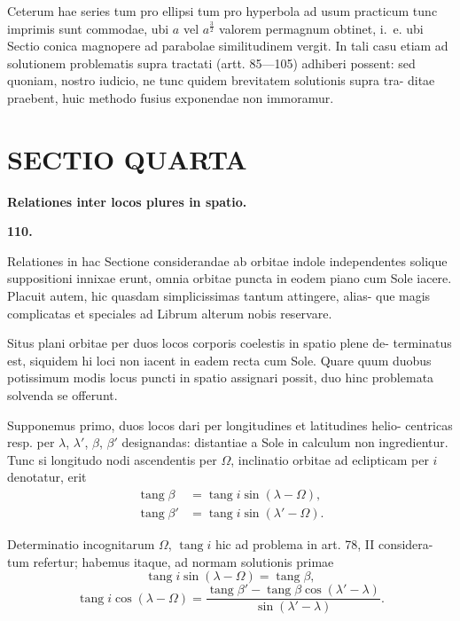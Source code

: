 \documentclass[12pt,a4paper]{article}
\DeclareMathOperator{\tang}{tang}
\begin{document}
Ceterum hae series tum pro ellipsi tum pro hyperbola ad usum practicum
tunc imprimis sunt commodae, ubi $a$ vel $a^{\frac{3}{2}}$ valorem permagnum obtinet, i.~e.
ubi Sectio conica magnopere ad parabolae similitudinem vergit. In tali casu
etiam ad solutionem problematis supra tractati (artt. 85---105) adhiberi possent:
sed quoniam, nostro iudicio, ne tunc quidem brevitatem solutionis supra tra-
ditae praebent, huic methodo fusius exponendae non immoramur.

\newpage
\section*{SECTIO QUARTA}

\begin{center}
\Large\textbf{Relationes inter locos plures in spatio.}
\end{center}

\bigskip
\noindent\textbf{110.}

Relationes in hac Sectione considerandae ab orbitae indole independentes
solique suppositioni innixae erunt, omnia orbitae puncta in eodem piano cum
Sole iacere. Placuit autem, hic quasdam simplicissimas tantum attingere, alias-
que magis complicatas et speciales ad Librum alterum nobis reservare.

Situs plani orbitae per duos locos corporis coelestis in spatio plene de-
terminatus est, siquidem hi loci non iacent in eadem recta cum Sole. Quare
quum duobus potissimum modis locus puncti in spatio assignari possit, duo
hinc problemata solvenda se offerunt.

Supponemus primo, duos locos dari per longitudines et latitudines helio-
centricas resp. per $\lambda$, $\lambda'$, $\beta$, $\beta'$ designandas: distantiae a Sole in calculum non
ingredientur. Tunc si longitudo nodi ascendentis per $\Omega$, inclinatio orbitae ad
eclipticam per $i$ denotatur, erit
\begin{align*}
\tang\beta &= \tang i \sin(\lambda - \Omega), \\
\tang\beta' &= \tang i \sin(\lambda' - \Omega).
\end{align*}

Determinatio incognitarum $\Omega$, $\tang i$ hic ad problema in art. 78, II considera-
tum refertur; habemus itaque, ad normam solutionis primae
\[
\tang i \sin(\lambda - \Omega) = \tang\beta,
\]
\[
\tang i \cos(\lambda - \Omega) = \frac{\tang\beta' - \tang\beta\cos(\lambda' - \lambda)}{\sin(\lambda' - \lambda)}.
\]
\end{document}
